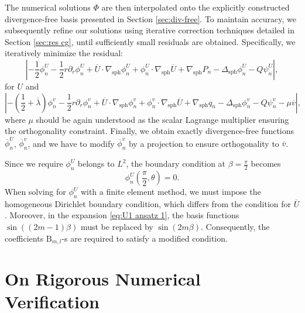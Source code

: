\documentclass[11pt,a4paper]{article}
\numberwithin{equation}{section}
\newcommand{\Beta}{\mathrm{B}}
\newcommand{\tmop}[1]{\ensuremath{\operatorname{#1}}}
\begin{document}
The numerical solutions $\Phi$ are then interpolated onto the explicitly
constructed divergence-free basis presented in Section \ref{sec:div-free}. To maintain accuracy, we subsequently refine our solutions using iterative
correction techniques detailed in Section \ref{sec:res cg}, until sufficiently
small residuals are obtained. Specifically, we iteratively minimize the
residual:
\[ \left| - \frac{1}{2} \phi_n^U - \frac{1}{2} r \partial_r \phi_n^U + \overline{U}
   \cdot \nabla_{\tmop{sph}} \phi_n^U + \phi_n^U \cdot \nabla_{\tmop{sph}} 
   \overline{U} + \nabla_{\tmop{sph}} P_n - \Delta_{\tmop{sph}} \phi_n^U - Q
   \psi_n^U \right|, \]
for $U$ and
\[ \left| - \left( \frac{1}{2} + \overline{\lambda} \right) \phi_n^v - \frac{1}{2}
   r \partial_r \phi_n^v + \overline{U} \cdot \nabla_{\tmop{sph}} \phi_n^v +
   \phi_n^v \cdot \nabla_{\tmop{sph}}  \overline{U} + \nabla_{\tmop{sph}} q_n -
   \Delta_{\tmop{sph}} \phi_n^v - Q \psi_n^v - \mu \overline{v} \right|, \]
where $\mu$ should be again understood as the scalar Lagrange multiplier
ensuring the orthogonality constraint. Finally, we obtain exactly
divergence-free functions $\overline{\phi}^U_n$, $\overline{\phi}^v_n$, and we have to
modify $\overline{\phi}^v_n$ by a projection to ensure orthogonality to $\overline{v}$.
\begin{remark}
    Since we require $\phi^U_n$ belongs to $L^2$, the boundary condition at $\beta=\frac{\pi}{2}$ becomes
\[
\phi^U_n(\frac{\pi}{2}, \theta) = 0.
\]
When solving for $\phi^U_n$ with a finite element method, we must impose the homogeneous Dirichlet boundary condition, which differs from the condition for $\overline{U}$. Moreover, in the expansion \eqref{eq:U1 ansatz 1}, the basis functions $\sin((2 m-1)\beta)$ must be replaced by $\sin(2 m \beta)$. Consequently, the coefficients $\Beta_{m,l}$-s are required to satisfy a modified condition.
\end{remark}


\section{On Rigorous Numerical Verification}\label{sec7}
\end{document}
